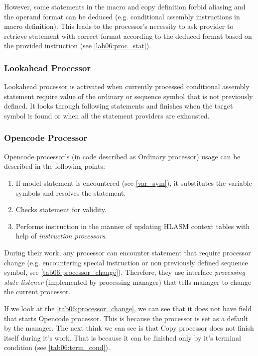 However, some statements in the macro and copy definition forbid aliasing and the operand format can be deduced (e.g. conditional assembly instructions in macro definition). This leads to the processor's necessity to ask provider to retrieve statement with correct format according to the deduced format based on the provided instruction  (see \cref{lab06:proc_stat}).

\subsubsection{Lookahead Processor}
\label{lab06:look}

Lookahead processor is activated when currently processed conditional assembly statement require value of the ordinary or sequence symbol that is not previously defined. It looks through following statements and finishes when the target symbol is found or when all the statement providers are exhausted.

\subsubsection{Opencode Processor}

Opencode processor's (in code described as Ordinary processor) usage can be described in the following points:
\begin{enumerate}
	\item If model statement is encountered (see \cref{var_sym}), it substitutes the variable symbols and resolves the statement.
	\item Checks statement for validity.
	\item Performs instruction in the manner of updating HLASM context tables with help of \emph{instruction processors}.
\end{enumerate}

\vspace{0.5cm}

During their work, any processor can encounter statement that require processor change (e.g. encountering special instruction or non previously defined sequence symbol, see \cref{tab06:processor_change}). Therefore, they use interface \emph{processing state listener} (implemented by processing manager) that tells manager to change the current processor.

If we look at the \cref{tab06:processor_change}, we can see that it does not have field that starts Opencode processor. This is because the processor is set as a default by the manager. The next think we can see is that Copy processor does not finish itself during it's work. That is because it  can be finished only by it's terminal condition (see \cref{tab06:term_cond}). 

